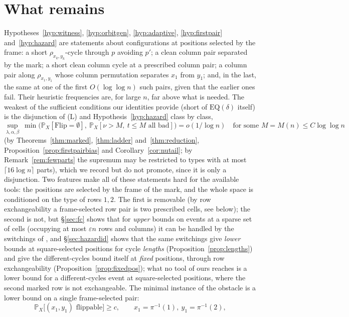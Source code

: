 \documentclass[11pt]{article}
\theoremstyle{definition}
\renewcommand{\Pr}{\mathbb{P}}
\begin{document}
\section{What remains}\label{sec:remains}

Hypotheses~\ref{hyp:witness}, \ref{hyp:orbitgen}, \ref{hyp:adaptive},
\ref{hyp:firstpair} and~\ref{hyp:hazard} are statements about configurations at positions
selected by the frame: a short $\rho_{x_k,y_k}$-cycle through $p$ avoiding $p'$; a clean
column pair separated by the mark; a short clean column cycle at a prescribed column pair;
a column pair along $\rho_{x_1,y_1}$ whose column permutation separates $x_1$ from $y_1$;
and, in the last, the same at one of the first $O(\log\log n)$ such pairs, given that the
earlier ones fail.  Their heuristic frequencies are, for large $n$, far above what is
needed.  The weakest of the sufficient conditions our identities provide (short of
$\mathrm{EQ}(\delta)$ itself) is the disjunction of (L) and Hypothesis~\ref{hyp:hazard}
class by class,
\[
\sup_{\lambda,\alpha,\beta}\ \min\bigl(\Pr_X[\mathrm{Flip}=\emptyset],\ \Pr_X[\nu>M,\ t\le M\text{ all bad}]\bigr)=o(1/\log n)
\quad\text{for some }M=M(n)\le C\log\log n
\]
(by Theorems~\ref{thm:marked}, \ref{thm:ladder} and~\ref{thm:reduction},
Proposition~\ref{prop:firstpairbias} and Corollary~\ref{cor:nutail}; by
Remark~\ref{rem:fewparts} the supremum may be restricted to types with at most
$\lceil16\log n\rceil$ parts), which we record but do not promote, since it is only a
disjunction.  Two features make all of these statements hard for the available tools: the
positions are selected by the frame of the mark, and the whole space is conditioned on the
type of rows $1,2$.  The first is removable (by row exchangeability a frame-selected row
pair is two prescribed cells, see below); the second is not, but \S\ref{sec:fc} shows that
for \emph{upper} bounds on events at a sparse set of cells (occupying at most $\varepsilon n$
rows and columns) it can be handled by the switchings of \cite{AM26}, and
\S\ref{sec:hazardid} shows that the same switchings give \emph{lower} bounds at
square-selected positions for cycle \emph{lengths} (Proposition~\ref{prop:lengths}) and
give the different-cycles bound itself at \emph{fixed} positions, through row
exchangeability (Proposition~\ref{prop:fixedpos}); what no tool of ours reaches is a
lower bound for a different-cycles event at square-selected positions, where the second
marked row is not exchangeable.  The minimal instance of the obstacle is a lower bound on a
single frame-selected pair:
\begin{equation}\label{eq:minimal}
\Pr_X\bigl[(x_1,y_1)\text{ flippable}\bigr]\ge c,\qquad x_1=\pi^{-1}(1),\ y_1=\pi^{-1}(2),
\end{equation}
\end{document}

